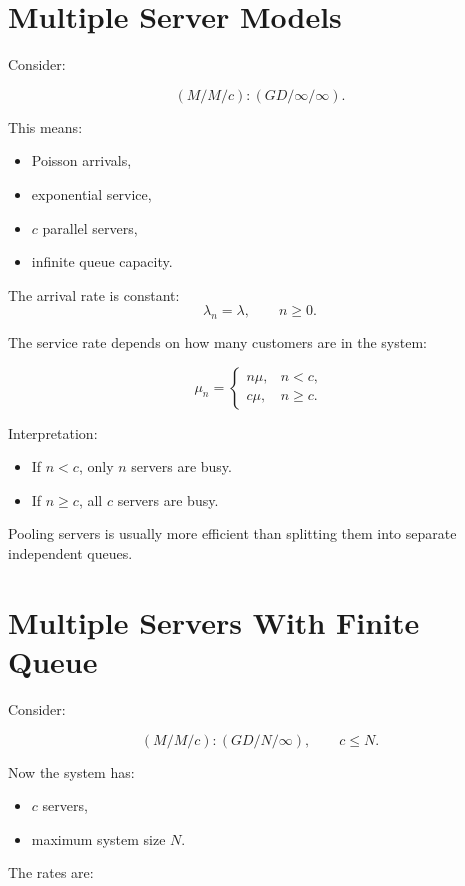 \documentclass[12pt]{article}
\begin{document}
\section{Multiple Server Models}

Consider:

\[
(M/M/c):(GD/\infty/\infty).
\]

This means:

\begin{itemize}
    \item Poisson arrivals,
    \item exponential service,
    \item \(c\) parallel servers,
    \item infinite queue capacity.
\end{itemize}

The arrival rate is constant:
\[
\lambda_n=\lambda,\qquad n\geq 0.
\]

The service rate depends on how many customers are in the system:

\[
\mu_n=
\begin{cases}
n\mu, & n<c,\\
c\mu, & n\geq c.
\end{cases}
\]

Interpretation:

\begin{itemize}
    \item If \(n<c\), only \(n\) servers are busy.
    \item If \(n\geq c\), all \(c\) servers are busy.
\end{itemize}

Pooling servers is usually more efficient than splitting them into separate independent queues.

\section{Multiple Servers With Finite Queue}

Consider:

\[
(M/M/c):(GD/N/\infty),\qquad c\leq N.
\]

Now the system has:

\begin{itemize}
    \item \(c\) servers,
    \item maximum system size \(N\).
\end{itemize}

The rates are:
\end{document}
